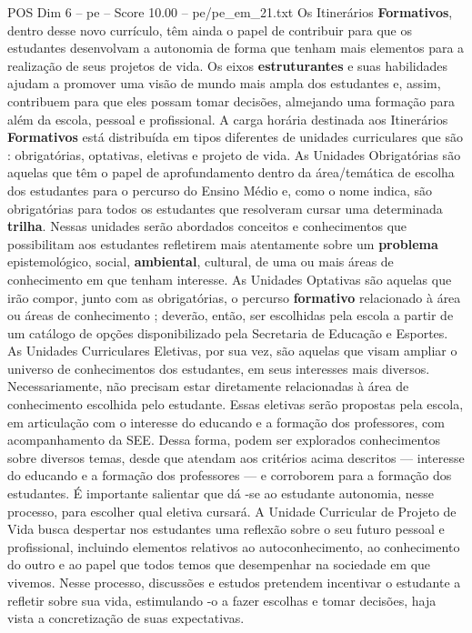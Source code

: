 \begin{textsample}{POS Dim 6 – pe – Score 10.00 – pe/pe\_em\_21.txt}
Os Itinerários \textbf{Formativos}, dentro desse novo currículo, têm ainda o papel de contribuir para que os estudantes desenvolvam a autonomia de forma que tenham mais elementos para a realização de seus projetos de vida.
Os eixos \textbf{estruturantes} e suas habilidades ajudam a promover uma visão de mundo mais ampla dos estudantes e, assim, contribuem para que eles possam tomar decisões, almejando uma formação para além da escola, pessoal e profissional.
A carga horária destinada aos Itinerários \textbf{Formativos} está distribuída em tipos diferentes de unidades curriculares que são : obrigatórias, optativas, eletivas e projeto de vida.
As Unidades Obrigatórias são aquelas que têm o papel de aprofundamento dentro da área/temática de escolha dos estudantes para o percurso do Ensino Médio e, como o nome indica, são obrigatórias para todos os estudantes que resolveram cursar uma determinada \textbf{trilha}.
Nessas unidades serão abordados conceitos e conhecimentos que possibilitam aos estudantes refletirem mais atentamente sobre um \textbf{problema} epistemológico, social, \textbf{ambiental}, cultural, de uma ou mais áreas de conhecimento em que tenham interesse.
As Unidades Optativas são aquelas que irão compor, junto com as obrigatórias, o percurso \textbf{formativo} relacionado à área ou áreas de conhecimento ; deverão, então, ser escolhidas pela escola a partir de um catálogo de opções disponibilizado pela Secretaria de Educação e Esportes.
As Unidades Curriculares Eletivas, por sua vez, são aquelas que visam ampliar o universo de conhecimentos dos estudantes, em seus interesses mais diversos.
Necessariamente, não precisam estar diretamente relacionadas à área de conhecimento escolhida pelo estudante.
Essas eletivas serão propostas pela escola, em articulação com o interesse do educando e a formação dos professores, com acompanhamento da SEE.
Dessa forma, podem ser explorados conhecimentos sobre diversos temas, desde que atendam aos critérios acima descritos — interesse do educando e a formação dos professores — e corroborem para a formação dos estudantes.
É importante salientar que dá -se ao estudante autonomia, nesse processo, para escolher qual eletiva cursará.
A Unidade Curricular de Projeto de Vida busca despertar nos estudantes uma reflexão sobre o seu futuro pessoal e profissional, incluindo elementos relativos ao autoconhecimento, ao conhecimento do outro e ao papel que todos temos que desempenhar na sociedade em que vivemos.
Nesse processo, discussões e estudos pretendem incentivar o estudante a refletir sobre sua vida, estimulando -o a fazer escolhas e tomar decisões, haja vista a concretização de suas expectativas.

\end{textsample}
